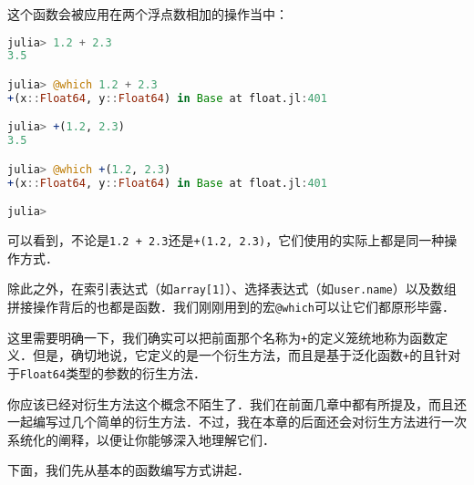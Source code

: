 这个函数会被应用在两个浮点数相加的操作当中：

\begin{lstlisting}[language=julia]
julia> 1.2 + 2.3
3.5

julia> @which 1.2 + 2.3
+(x::Float64, y::Float64) in Base at float.jl:401

julia> +(1.2, 2.3)
3.5

julia> @which +(1.2, 2.3)
+(x::Float64, y::Float64) in Base at float.jl:401

julia>
\end{lstlisting}

可以看到，不论是\verb|1.2 + 2.3|还是\verb|+(1.2, 2.3)|，它们使用的实际上都是同一种操作方式．

除此之外，在索引表达式（如\verb|array[1]|）、选择表达式（如\verb|user.name|）以及数组拼接操作背后的也都是函数．我们刚刚用到的宏\verb|@which|可以让它们都原形毕露．

这里需要明确一下，我们确实可以把前面那个名称为\verb|+|的定义笼统地称为函数定义．但是，确切地说，它定义的是一个衍生方法，而且是基于泛化函数\verb|+|的且针对于\verb|Float64|类型的参数的衍生方法．

你应该已经对衍生方法这个概念不陌生了．我们在前面几章中都有所提及，而且还一起编写过几个简单的衍生方法．不过，我在本章的后面还会对衍生方法进行一次系统化的阐释，以便让你能够深入地理解它们．

下面，我们先从基本的函数编写方式讲起．
